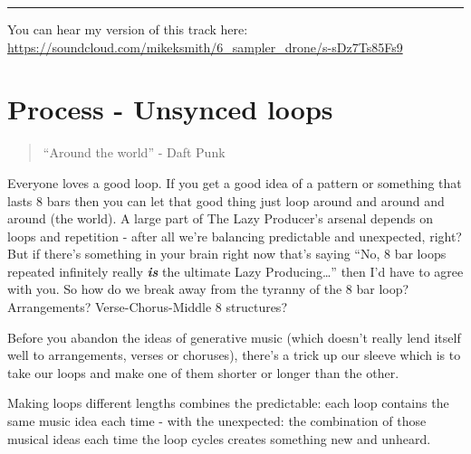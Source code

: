 \documentclass[
  12pt,
  letterpaper,
  oneside,
  open=any]{scrbook}
\begin{document}
\begin{center}\rule{0.5\linewidth}{0.5pt}\end{center}

You can hear my version of this track here:
\url{https://soundcloud.com/mikeksmith/6_sampler_drone/s-sDz7Ts85Fs9}


\chapter{Process - Unsynced
loops}\label{Chapter-021-Process-Unsynced_loops}

\begin{quote}
``Around the world'' - Daft Punk
\end{quote}

Everyone loves a good loop. If you get a good idea of a pattern or
something that lasts 8 bars then you can let that good thing just loop
around and around and around (the world). A large part of The Lazy
Producer's arsenal depends on loops and repetition - after all we're
balancing predictable and unexpected, right? But if there's something in
your brain right now that's saying ``No, 8 bar loops repeated infinitely
really \textbf{\emph{is}} the ultimate Lazy Producing\ldots{}'' then I'd
have to agree with you. So how do we break away from the tyranny of the
8 bar loop? Arrangements? Verse-Chorus-Middle 8 structures?

Before you abandon the ideas of generative music (which doesn't really
lend itself well to arrangements, verses or choruses), there's a trick
up our sleeve which is to take our loops and make one of them shorter or
longer than the other.

\begin{tcolorbox}[enhanced jigsaw, opacitybacktitle=0.6, rightrule=.15mm, leftrule=.75mm, opacityback=0, toptitle=1mm, toprule=.15mm, breakable, titlerule=0mm, colback=white, bottomtitle=1mm, title=\textcolor{quarto-callout-tip-color}{\faLightbulb}\hspace{0.5em}{Key idea}, coltitle=black, left=2mm, colframe=quarto-callout-tip-color-frame, bottomrule=.15mm, colbacktitle=quarto-callout-tip-color!10!white, arc=.35mm]

Making loops different lengths combines the predictable: each loop
contains the same music idea each time - with the unexpected: the
combination of those musical ideas each time the loop cycles creates
something new and unheard.

\end{tcolorbox}
\end{document}
